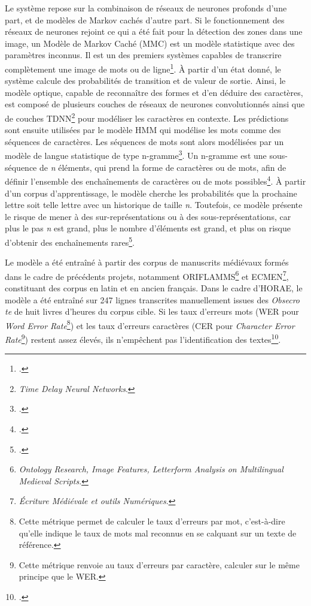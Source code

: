 \documentclass[a4paper,12pt,twoside]{book}
\begin{document}
	Le système repose sur la combinaison de réseaux de neurones profonds d'une part, et de modèles de Markov cachés d'autre part. Si le fonctionnement des réseaux de neurones rejoint ce qui a été fait pour la détection des zones dans une image, un Modèle de Markov Caché (MMC) est un modèle statistique avec des paramètres inconnus. Il est un des premiers systèmes capables de transcrire complètement une image de mots ou de ligne\footcite[p. 66]{Reconnaissance_HTR_These}. À partir d'un état donné, le système calcule des probabilités de transition et de valeur de sortie. Ainsi, le modèle optique, capable de reconnaître des formes et d'en déduire des caractères, est composé de plusieurs couches de réseaux de neurones convolutionnés ainsi que de couches TDNN\footnote{\textit{Time Delay Neural Networks}.} pour modéliser les caractères en contexte. Les prédictions sont ensuite utilisées par le modèle HMM qui modélise les mots comme des séquences de caractères. Les séquences de mots sont alors modélisées par un modèle de langue statistique de type n-gramme\footcite[p. 24]{Seg_Livres_Heures}. Un n-gramme est une sous-séquence de \textit{n} éléments, qui prend la forme de caractères ou de mots, afin de définir l'ensemble des enchaînements de caractères ou de mots possibles\footcite[p. 66]{Reconnaissance_HTR_These}. À partir d'un corpus d'apprentissage, le modèle cherche les probabilités que la prochaine lettre soit telle lettre avec un historique de taille \textit{n}. Toutefois, ce modèle présente le risque de mener à des sur-représentations ou à des sous-représentations, car plus le pas \textit{n} est grand, plus le nombre d’éléments est grand, et plus on risque d’obtenir des enchaînements rares\footcite[p. 65]{Reconnaissance_HTR_These}.
	
	Le modèle a été entraîné à partir des corpus de manuscrits médiévaux formés dans le cadre de précédents projets, notamment ORIFLAMMS\footnote{\textit{Ontology Research, Image Features, Letterform Analysis on Multilingual Medieval Scripts}.} et ECMEN\footnote{\textit{Écriture Médiévale et outils Numériques}.}, constituant des corpus en latin et en ancien français. Dans le cadre d'HORAE, le modèle a été entraîné sur 247 lignes transcrites manuellement issues des \textit{Obsecro te} de huit livres d'heures du corpus cible. Si les taux d'erreurs mots (WER pour \textit{Word Error Rate}\footnote{Cette métrique permet de calculer le taux d'erreurs par mot, c'est-à-dire qu'elle indique le taux de mots mal reconnus en se calquant sur un texte de référence.}) et les taux d'erreurs caractères (CER pour \textit{Character Error Rate}\footnote{Cette métrique renvoie au taux d'erreurs par caractère, calculer sur le même principe que le WER.}) restent assez élevés, ils n'empêchent pas l'identification des textes\footcite[p. 25]{Seg_Livres_Heures}. \\
	
\end{document}
